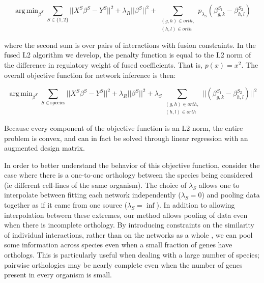 \documentclass[11pt]{article}
\DeclareMathOperator*{\argmin}{arg\,min}
\begin{document}
\begin{equation}
\argmin_{\beta^S} \displaystyle\sum_{S \in \{1, 2\}} \vert \vert X^S\beta^S - Y^S \vert \vert ^2 + \lambda_R \vert \vert \beta^S \vert \vert ^2 + \displaystyle \sum_{\substack{(g,h) \in orth,\\
 (h,l) \in orth}}p_{\lambda_S}(\beta^{S_1}_{g,k} - \beta^{S_2}_{h,l})
\end{equation}

where the second sum is over pairs of interactions with fusion constraints. In the fused L2 algorithm we develop, the penalty function is equal to the L2 norm of the difference in regulatory weight of fused coefficients. That is, $p(x)=x^2$. The overall objective function for network inference is then:

\begin{equation}
\argmin_{\beta^S} \displaystyle\sum_{S \in \text{species}} \vert \vert X^S\beta^S - Y^S \vert \vert ^2 + \lambda_R \vert \vert \beta^S \vert \vert ^2 + \displaystyle \lambda_S \sum_{\substack{(g,h) \in orth,\\
 (h,l) \in orth}} \vert \vert (\beta^{S_1}_{g,k} - \beta^{S_2}_{h,l}) \vert \vert ^2
\end{equation}

Because every component of the objective function is an L2 norm, the entire problem is convex, and can in fact be solved through linear regression with an augmented design matrix. %

In order to better understand the behavior of this objective function, consider the case where there is a one-to-one orthology between the species being considered (ie different cell-lines of the same organism). The choice of $\lambda_S$ allows one to interpolate between fitting each network independently ($\lambda_S=0$) and pooling data together as if it came from one source ($\lambda_S=\inf$). In addition to allowing interpolation between these extremes, our method allows pooling of data even when there is incomplete orthology. By introducing constraints on the similarity of individual interactions, rather than on the networks as a whole \cite{liu2011temporal}, we can pool some information across species even when a small fraction of genes have orthologs. This is particularly useful when dealing with a large number of species; pairwise orthologies may be nearly complete even when the number of genes present in every organism is small. 
\end{document}
